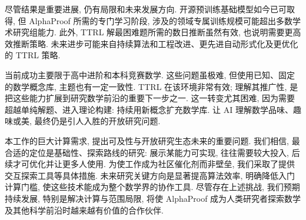 尽管结果是重要进展, 仍有局限和未来发展方向. 开源预训练基础模型如今已可取得, 但 AlphaProof 所需的专门学习阶段, 涉及的领域专属训练规模可能超出多数学术研究组能力. 此外, TTRL 解最困难题所需的数日推断虽然有效, 也说明需要更高效推断策略. 未来进步可能来自持续算法和工程改进、更先进自动形式化及更优化的 TTRL 策略.

当前成功主要限于高中进阶和本科竞赛数学. 这些问题虽极难, 但使用已知、固定的数学概念库, 主题也有一定一致性. TTRL 在该环境非常有效; 理解其推广性, 是把这些能力扩展到研究数学前沿的重要下一步之一. 这一转变尤其困难, 因为需要超越单纯解题、进入理论构建: 持续用新概念扩充数学库. 让 AI 理解数学品味、趣味或美, 最终仍是引人入胜的开放研究问题.

本工作的巨大计算需求, 提出可及性与开放研究生态未来的重要问题. 我们相信, 最合适的定位是基础性、探索路线的研究: 展示某能力可实现, 往往需要较大投入, 后续才可优化并让更多人使用. 为使工作成为社区催化剂而非壁垒, 我们采取了提供交互探索工具等具体措施. 未来研究关键方向是显著提高算法效率, 明确降低入门计算门槛, 使这些技术能成为整个数学界的协作工具. 尽管存在上述挑战, 我们预期持续发展, 特别是解决计算与范围局限, 将使 AlphaProof 成为人类研究者探索数学及其他科学前沿时越来越有价值的合作伙伴.





\label{alphaproof-end}

